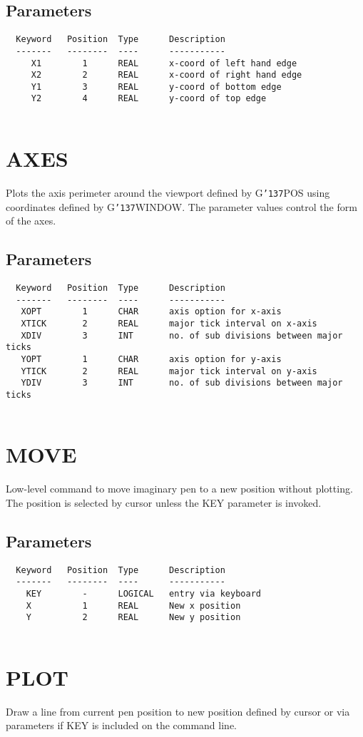 \documentclass{book}
\renewcommand{\_}{{\tt\char'137}}     %
\begin{document}
\subsection{Parameters}
\begin{verbatim}
  Keyword   Position  Type      Description
  -------   --------  ----      -----------
     X1        1      REAL      x-coord of left hand edge
     X2        2      REAL      x-coord of right hand edge
     Y1        3      REAL      y-coord of bottom edge
     Y2        4      REAL      y-coord of top edge
 
\end{verbatim}\section{AXES}
Plots the axis perimeter around the viewport defined by G\_POS
using coordinates defined by G\_WINDOW. The parameter values
control the form of the axes.
 
\subsection{Parameters}
\begin{verbatim}
  Keyword   Position  Type      Description
  -------   --------  ----      -----------
   XOPT        1      CHAR      axis option for x-axis
   XTICK       2      REAL      major tick interval on x-axis
   XDIV        3      INT       no. of sub divisions between major ticks
   YOPT        1      CHAR      axis option for y-axis
   YTICK       2      REAL      major tick interval on y-axis
   YDIV        3      INT       no. of sub divisions between major ticks
 
\end{verbatim}\section{MOVE}
Low-level command to move imaginary pen to a new position without
plotting. The position is selected by cursor unless the KEY
parameter is invoked.
 
\subsection{Parameters}
\begin{verbatim}
  Keyword   Position  Type      Description
  -------   --------  ----      -----------
    KEY        -      LOGICAL   entry via keyboard
    X          1      REAL      New x position
    Y          2      REAL      New y position
 
\end{verbatim}\section{PLOT}
Draw a line from current pen position to new position defined
by cursor or via parameters if KEY is included on the command
line.
 
\end{document}
